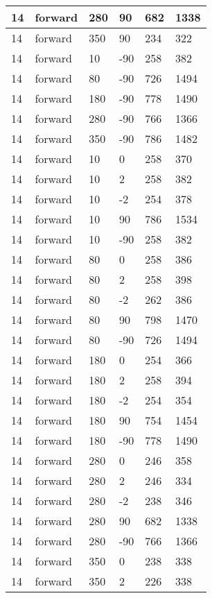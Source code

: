 \begin{table}
\begin{center}
\begin{tabular}{|l|l|l|l|l|l|}
			\hline
			14 & forward & 280 & 90 & 682 & 1338 \\
			\hline
			14 & forward & 350 & 90 & 234 & 322 \\
			\hline
			14 & forward & 10 & -90 & 258 & 382 \\
			\hline
			14 & forward & 80 & -90 & 726 & 1494 \\
			\hline
			14 & forward & 180 & -90 & 778 & 1490 \\
			\hline
			14 & forward & 280 & -90 & 766 & 1366 \\
			\hline
			14 & forward & 350 & -90 & 786 & 1482 \\
			\hline
			14 & forward & 10 & 0 & 258 & 370 \\
			\hline
			14 & forward & 10 & 2 & 258 & 382 \\
			\hline
			14 & forward & 10 & -2 & 254 & 378 \\
			\hline
			14 & forward & 10 & 90 & 786 & 1534 \\
			\hline
			14 & forward & 10 & -90 & 258 & 382 \\
			\hline
			14 & forward & 80 & 0 & 258 & 386 \\
			\hline
			14 & forward & 80 & 2 & 258 & 398 \\
			\hline
			14 & forward & 80 & -2 & 262 & 386 \\
			\hline
			14 & forward & 80 & 90 & 798 & 1470 \\
			\hline
			14 & forward & 80 & -90 & 726 & 1494 \\
			\hline
			14 & forward & 180 & 0 & 254 & 366 \\
			\hline
			14 & forward & 180 & 2 & 258 & 394 \\
			\hline
			14 & forward & 180 & -2 & 254 & 354 \\
			\hline
			14 & forward & 180 & 90 & 754 & 1454 \\
			\hline
			14 & forward & 180 & -90 & 778 & 1490 \\
			\hline
			14 & forward & 280 & 0 & 246 & 358 \\
			\hline
			14 & forward & 280 & 2 & 246 & 334 \\
			\hline
			14 & forward & 280 & -2 & 238 & 346 \\
			\hline
			14 & forward & 280 & 90 & 682 & 1338 \\
			\hline
			14 & forward & 280 & -90 & 766 & 1366 \\
			\hline
			14 & forward & 350 & 0 & 238 & 338 \\
			\hline
			14 & forward & 350 & 2 & 226 & 338 \\

\end{tabular}
\end{center}
\end{table}
